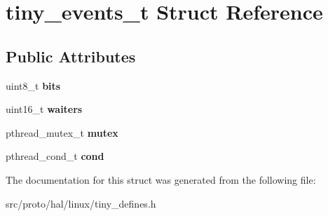 \hypertarget{structtiny__events__t}{}\section{tiny\+\_\+events\+\_\+t Struct Reference}
\label{structtiny__events__t}
\subsection*{Public Attributes}
\begin{DoxyCompactItemize}
\item 
\mbox{\label{structtiny__events__t_a77c4f1248c03a789759d955c311d6aa7}} 
uint8\+\_\+t {\bfseries bits}
\item 
\mbox{\label{structtiny__events__t_a14538abea5990b9110cb977f927b669f}} 
uint16\+\_\+t {\bfseries waiters}
\item 
\mbox{\label{structtiny__events__t_a244fb0a0d7a8b0a62d6307edb30f9689}} 
pthread\+\_\+mutex\+\_\+t {\bfseries mutex}
\item 
\mbox{\label{structtiny__events__t_aa6ad3fc6bc0c001affae7b10cd1acd88}} 
pthread\+\_\+cond\+\_\+t {\bfseries cond}
\end{DoxyCompactItemize}


The documentation for this struct was generated from the following file\+:\begin{DoxyCompactItemize}
\item 
src/proto/hal/linux/tiny\+\_\+defines.\+h\end{DoxyCompactItemize}
